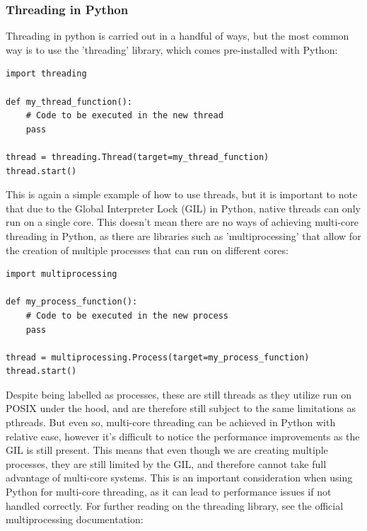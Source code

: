 \documentclass[12pt,a4paper]{article}
\begin{document}
\subsubsection{Threading in Python}

Threading in python is carried out in a handful of ways, but the most common way is to use the 'threading' library\parencite{PythonThreading}, which comes pre-installed with Python:

\begin{verbatim}
import threading

def my_thread_function():
    # Code to be executed in the new thread
    pass

thread = threading.Thread(target=my_thread_function)
thread.start()
\end{verbatim}

This is again a simple example of how to use threads, but it is important to note that due to the Global Interpreter Lock (GIL) in Python, native threads can only run on a single core\parencite{PythonGIL}. This doesn't mean there are no ways of achieving multi-core threading in Python, as there are libraries such as 'multiprocessing' that allow for the creation of multiple processes that can run on different cores:

\begin{verbatim}
import multiprocessing

def my_process_function():
    # Code to be executed in the new process
    pass

thread = multiprocessing.Process(target=my_process_function)
thread.start()
\end{verbatim}

Despite being labelled as processes, these are still threads as they utilize run on POSIX under the hood\parencite{PythonMultiprocessing}, and are therefore still subject to the same limitations as pthreads. But even so, multi-core threading can be achieved in Python with relative ease, however it's difficult to notice the performance improvements as the GIL is still present\parencite{PythonGIL}. This means that even though we are creating multiple processes, they are still limited by the GIL, and therefore cannot take full advantage of multi-core systems. This is an important consideration when using Python for multi-core threading, as it can lead to performance issues if not handled correctly. For further reading on the threading library, see the official multiprocessing documentation: 
\end{document}
